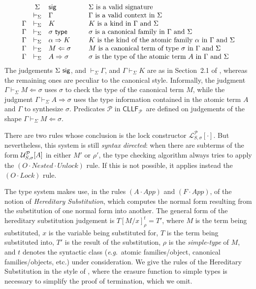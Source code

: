 \documentclass[submission,copyright,creativecommons]{eptcs}
\theoremstyle{plain}
\theoremstyle{definition}
\newcommand{\CLLFP} {\mbox{$\mathsf{CLLF}_{\mathcal P}$}}
\newcommand {\eg}        {{\textit{e}.\textit{g}.}}
\newcommand {\Lock}   [4] {{\mathcal{L}}^{#1}_{#2, #3}[{#4}]} \newcommand {\LockC} [3] {{\mathcal{L}}^{#1}_{#2}      [{#3}]}
\newcommand {\VDASHS} {\vdash_\Sigma} \newcommand {\VDASHO} {\vdash_\Omega} \newcommand {\VDASHCBV} {\vdash_{\Sigma_{{CBV}}}} \newcommand {\VDASHSIMP} {\vdash_{\Sigma_{{Imp}}}} \newcommand {\VDASHSHOARE} {\vdash_{\Sigma_{{Hoare}}}} \newcommand {\VDASHSERASE} {\vdash_{\Sigma^\Erase}}    \newcommand {\VDASHEAL} {\vdash_{EAL}} \newcommand {\VDASHSEAL} {\vdash_{\Sigma_{{EAL}}}} \newcommand {\VDASHFP} {\vdash_{\sf FPST}}
\renewcommand {\P} {\mathcal{P}} \newcommand {\Q} {\mathcal{Q}}
\renewcommand {\L} {\mathcal{L}} \newcommand   {\C} {\mathcal{C}} \newcommand   {\T} {\mathcal{T}} \newcommand   {\U} {\mathcal{U}}
\newcommand{\up}[1]   {\vspace{-#1mm}}
\newcommand{\Erase} {{-\U\L}}
\begin{document}
\up{1}
{\small
$$
\begin{array}{rcl@{\hspace{0.9cm}}l}
 & \Sigma & \sig & \mbox{$\Sigma$ is a valid signature} \\
 & \VDASHS & \Gamma & \mbox{$\Gamma$ is a valid context in
  $\Sigma$} \\
  \Gamma & \VDASHS & K & \mbox{$K$ is a kind in $\Gamma$ and
  $\Sigma$} \\
 \Gamma & \VDASHS & \sigma\ \Type
 & \mbox{$\sigma$ is a canonical family in $\Gamma$ and $\Sigma$} \\
 \Gamma & \VDASHS & \alpha \Rightarrow K
 & \mbox{$K$ is the kind of the atomic family  $\alpha$ in $\Gamma$ and $\Sigma$} \\
 \Gamma & \VDASHS & M \Leftarrow \sigma
 & \mbox{$M$ is a canonical term of type $\sigma$ in $\Gamma$ and $\Sigma$} \\
 \Gamma & \VDASHS & A \Rightarrow \sigma
 & \mbox{$\sigma$ is the type of the atomic term $A$ in $\Gamma$ and $\Sigma$}
\end{array}
$$
}
The judgements $\Sigma\ {\mathsf {sig}} $, and $\VDASHS \Gamma$, and
$\Gamma \VDASHS K$ are as in Section~2.1 of \cite{HLLMSJ12}, whereas
the remaining ones are peculiar to the canonical style.  Informally,
the judgment $\Gamma \VDASHS M \Leftarrow \sigma$ uses $\sigma$ to
check the type of the canonical term $M$, while the judgment
$\Gamma\VDASHS A \Rightarrow \sigma$ uses the type information
contained in the atomic term $A$ and $\Gamma$ to synthesize $\sigma$.
Predicates $\P$ in \CLLFP\ are defined on judgements of the shape
$\Gamma \VDASHS M\Leftarrow \sigma$.

There are two rules whose conclusion is the lock constructor
$\Lock{\P}{S}{\sigma}{\cdot}$. But nevertheless, this system is still
\emph{syntax directed}: when there are subterms of the form
$\Unlock{\P}{S}{\sigma}{A}$ in either $M'$ or $\rho'$, the type
checking algorithm always tries to apply the
$(O\cdot Nested\cdot Unlock)$ rule. If this is not possible, it
applies instead the $(O\cdot Lock)$ rule.

The type system makes use, in the rules $({A{\cdot}App})$ and
$(F{\cdot}App)$, of the notion of \emph{Hereditary Substitution},
which computes the normal form resulting from the substitution of one
normal form into another.  The general form of the hereditary
substitution judgement is $T[M/x]^{t}_{\rho}=T'$, where $M$ is the
term being substituted, $x$ is the variable being substituted for, $T$
is the term being substituted into, $T'$ is the result of the
substitution, $\rho$ is the \emph{simple-type} of $M$, and $t$ denotes
the syntactic class (\eg\ atomic families/object, canonical
families/objects, etc.) under consideration. We give the rules of the
Hereditary Substitution in the style of \cite{HarperLicata-jfp-07},
where the erasure function to simple types is necessary to simplify
the proof of termination, which we omit.
\end{document}
